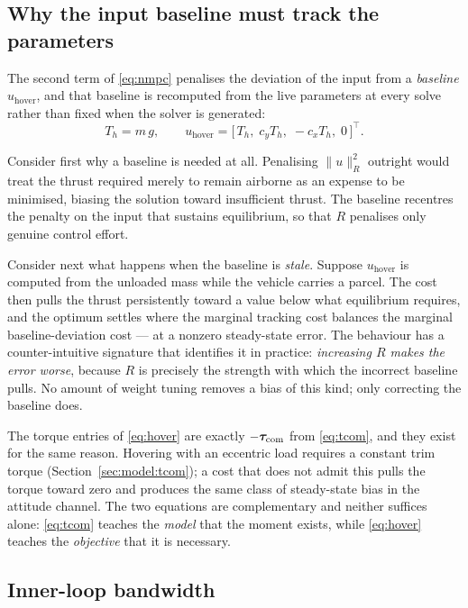 \subsection{Why the input baseline must track the parameters}\label{sec:model:hover}

The second term of \eqref{eq:nmpc} penalises the deviation of the input
from a \emph{baseline} $u_{\mathrm{hover}}$, and that baseline is
recomputed from the live parameters at every solve rather than fixed when
the solver is generated:
\begin{equation}
T_h = m\,g,
\qquad
u_{\mathrm{hover}} = \bigl[\, T_h,\; c_y T_h,\; -c_x T_h,\; 0 \,\bigr]^{\!\top}.
\label{eq:hover}
\end{equation}

Consider first why a baseline is needed at all. Penalising $\|u\|^2_R$
outright would treat the thrust required merely to remain airborne as an
expense to be minimised, biasing the solution toward insufficient thrust.
The baseline recentres the penalty on the input that sustains
equilibrium, so that $R$ penalises only genuine control effort.

Consider next what happens when the baseline is \emph{stale}. Suppose
$u_{\mathrm{hover}}$ is computed from the unloaded mass while the vehicle
carries a parcel. The cost then pulls the thrust persistently toward a
value below what equilibrium requires, and the optimum settles where the
marginal tracking cost balances the marginal baseline-deviation cost ---
at a nonzero steady-state error. The behaviour has a counter-intuitive
signature that identifies it in practice: \emph{increasing $R$ makes the
error worse}, because $R$ is precisely the strength with which the
incorrect baseline pulls. No amount of weight tuning removes a bias of
this kind; only correcting the baseline does.

The torque entries of \eqref{eq:hover} are exactly $-\bm{\tau}_{\mathrm{com}}$ from
\eqref{eq:tcom}, and they exist for the same reason. Hovering with an
eccentric load requires a constant trim torque
(Section~\ref{sec:model:tcom}); a cost that does not admit this pulls the
torque toward zero and produces the same class of steady-state bias in
the attitude channel. The two equations are complementary and neither
suffices alone: \eqref{eq:tcom} teaches the \emph{model} that the moment
exists, while \eqref{eq:hover} teaches the \emph{objective} that it is
necessary.

\subsection{Inner-loop bandwidth}\label{sec:model:gain}

